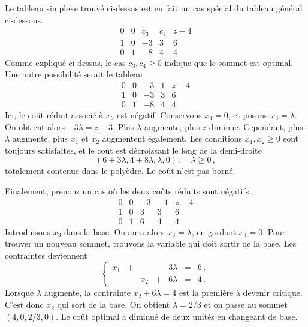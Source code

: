 \begin{myexem}
	Le tableau simplexe trouvé ci-dessus est en fait
	un cas spécial du tableau général ci-dessous.
	\[
	\renewcommand{\arraystretch}{1.5}
	\begin{array}{cccc|c}
		0 & 0 & c_3 & c_4 & z-4 \\
		\hline
		1 & 0 &  -3 &   3 &   6 \\
		0 & 1 &  -8 &   4 &   4
	\end{array}
	\]
	Comme expliqué ci-dessus, le cas $c_3, c_4 \ge 0$
	indique que le sommet est optimal.
	Une autre possibilité serait le tableau
	\[
	\renewcommand{\arraystretch}{1.5}
	\begin{array}{cccc|c}
		0 & 0 & -3 & 1 & z-4 \\
		\hline
		1 & 0 & -3 &  3 &   6 \\
		0 & 1 & -8 &  4 &   4
	\end{array}
	\]
	Ici, le coût réduit associé à $x_3$ est négatif.
	Conservons $x_4 = 0$, et posons $x_3 = \lambda$.
	On obtient alors $-3 \lambda = z - 3$.
	Plus $\lambda$ augmente, plus $z$ diminue.
	Cependant, plus $\lambda$ augmente,
	plus $x_1$ et $x_2$ augmentent également.
	Les conditions $x_1,x_2 \ge 0$ sont toujours satisfaites,
	et le coût est décroissant le long de la demi-droite
	\[
	(6+3\lambda,4+8\lambda,\lambda,0)\,,\quad \lambda \ge 0\,,
	\]
	totalement contenue dans le polyèdre.
	Le coût n'est pas borné.

	Finalement, prenons un cas
	où les deux coûts réduits sont négatifs.
	\[
	\renewcommand{\arraystretch}{1.5}
	\begin{array}{cccc|c}
		0 & 0 & -3 & -1 & z-4 \\
		\hline
		1 & 0 &  3 &   3 &  6 \\
		0 & 1 &  6 &   4 &  4
	\end{array}
	\]
	Introduisons $x_3$ dans la base.
	On aura alors $x_3 = \lambda$, en gardant $x_4 = 0$.
	Pour trouver un nouveau sommet,
	trouvons la variable qui doit sortir de la base.
	Les contraintes deviennent
	\[
	\renewcommand{\arraystretch}{1.5}
	\left\{
	\begin{array}{rcrcrcr}
		x_1 & + &     &   & 3 \lambda & = & 6\,,\\
		    &   & x_2 & + & 6 \lambda & = & 4\,.
	\end{array}
	\right.
	\]
	Lorsque $\lambda$ augmente,
	la contrainte $x_2 + 6 \lambda = 4$ est
	la première à devenir critique.
	C'est donc $x_2$ qui sort de la base.
	On obtient $\lambda = 2/3$
	et on passe au sommet $(4,0,2/3,0)$.
	Le coût optimal a diminué de deux unités en changeant de base.
\end{myexem}

